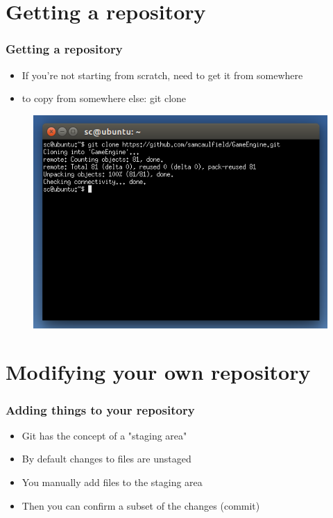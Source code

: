 \documentclass{beamer}
\begin{document}
\section{Getting a repository}
\begin{frame}
\frametitle{Getting a repository}
\begin{itemize}
\item If you're not starting from scratch, need to get it from somewhere
\item to copy from somewhere else: git clone
\end{itemize}
\begin{figure}
\begin{center}
\includegraphics[scale=0.5]{gitclone}
\end{center}
\end{figure}
\end{frame}

\section{Modifying your own repository}
\begin{frame}
\frametitle{Adding things to your repository}
\begin{itemize}
\item Git has the concept of a "staging area"
\item By default changes to files are unstaged
\item You manually add files to the staging area
\item Then you can confirm a subset of the changes (commit)
\end{itemize}
\end{frame}
\end{document}
